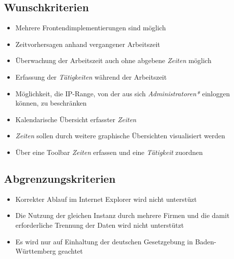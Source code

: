\subsection{Wunschkriterien}

\begin{itemize}
	\item Mehrere Frontendimplementierungen sind möglich
	\item Zeitvorhersagen anhand vergangener Arbeitszeit
	\item Überwachung der Arbeitszeit auch ohne abgebene \emph{Zeiten} möglich
	\item Erfassung der \emph{Tätigkeiten} während der Arbeitszeit
	\item Möglichkeit, die IP-Range, von der aus sich \emph{Administratoren*} einloggen können, zu beschränken
	\item Kalendarische Übersicht erfasster \emph{Zeiten}
	\item \emph{Zeiten} sollen durch weitere graphische Übersichten visualisiert werden
	\item Über eine Toolbar \emph{Zeiten} erfassen und eine \emph{Tätigkeit} zuordnen
\end{itemize}


\subsection{Abgrenzungskriterien}
\begin{itemize}
	\item Korrekter Ablauf im Internet Explorer wird nicht unterstüzt
	\item Die Nutzung der gleichen Instanz durch mehrere Firmen und die damit erforderliche Trennung der Daten wird nicht unterstützt
	\item Es wird nur auf Einhaltung der deutschen Gesetzgebung in Baden-Württemberg geachtet
\end{itemize}
